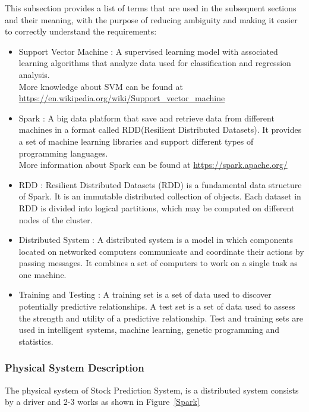 \documentclass[12pt]{article}
\newcommand{\progname}{Stock Prediction System} %
\begin{document}
This subsection provides a list of terms that are used in the subsequent
sections and their meaning, with the purpose of reducing ambiguity and making it
easier to correctly understand the requirements:

\begin{itemize}

\item Support Vector Machine :
A supervised learning model with associated learning algorithms that analyze
data used for classification and regression analysis.\\ More knowledge about SVM can be found at \url{https://en.wikipedia.org/wiki/Support_vector_machine}

\item Spark :
A big data platform that save and retrieve data from different machines in a format called RDD(Resilient Distributed Datasets). It provides a set of machine learning libraries and support different types of programming languages. \\
More information about Spark can be found at \url{https://spark.apache.org/}
\item RDD :
Resilient Distributed Datasets (RDD) is a fundamental data structure of Spark. It is an immutable distributed collection of objects. Each dataset in RDD is divided into logical partitions, which may be computed on different nodes of the cluster.
\item Distributed System :
A distributed system is a model in which components located on networked computers communicate and coordinate their actions by passing messages. It combines a set of computers to work on a single task as one machine.
\item Training and Testing :
A training set is a set of data used to discover potentially predictive relationships. A test set is a set of data used to assess the strength and utility of a predictive relationship. Test and training sets are used in intelligent systems, machine learning, genetic programming and statistics.

\end{itemize}

\subsubsection{Physical System Description}

The physical system of \progname{}, is a distributed system consists by a driver
and 2-3 works as shown in Figure~\ref{Spark}
\end{document}
